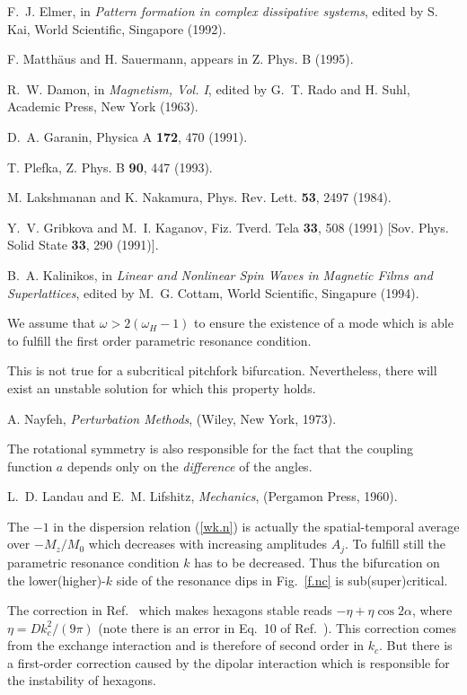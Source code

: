 \begin{references}
F.~J. Elmer, in {\it Pattern formation in complex dissipative
systems}, edited by S. Kai, World Scientific, Singapore (1992).

F. Matth\"aus and H. Sauermann, appears in Z. Phys. B (1995).

R.~W. Damon, in {\it Magnetism, Vol. I}, edited by G.~T. Rado and
H. Suhl, Academic Press, New York (1963).

D.~A. Garanin, Physica A {\bf 172}, 470 (1991).

T. Plefka, Z. Phys. B {\bf 90}, 447 (1993).

M. Lakshmanan and K. Nakamura, Phys. Rev. Lett. {\bf 53}, 2497 
(1984).

Y.~V. Gribkova and M.~I. Kaganov, Fiz. Tverd. Tela {\bf 33}, 508 
(1991) [Sov. Phys. Solid State {\bf 33}, 290 (1991)].

B.~A. Kalinikos, in {\it Linear and Nonlinear Spin Waves in Magnetic
Films and Superlattices}, edited by M.~G. Cottam, World Scientific,
Singapure (1994).

We assume that $\omega>2(\omega_H-1)$ to ensure the existence of a
mode which is able to fulfill the first order parametric resonance
condition.

This is not true for a subcritical pitchfork bifurcation.
Nevertheless, there will exist an unstable solution for which this
property holds.

A. Nayfeh, {\it Perturbation Methods}, (Wiley, New York, 1973).

The rotational symmetry is also responsible for the fact that the
coupling function $a$ depends only on the {\em difference\/} of the 
angles.

L.~D. Landau and E.~M. Lifshitz, {\it Mechanics}, (Pergamon Press,
1960).

The $-1$ in the dispersion relation (\ref{wk.n}) is actually the 
spatial-temporal average over $-M_z/M_0$ which decreases with
increasing amplitudes $A_j$. To fulfill still the parametric
resonance condition $k$ has to be decreased. Thus the bifurcation on
the lower(higher)-$k$ side of the resonance dips in Fig.~\ref{f.nc}
is sub(super)critical.

The correction in Ref.~ which makes hexagons
stable reads $-\eta+\eta\cos 2\alpha$, where $\eta=Dk_c^2/(9\pi)$
(note there is an error in Eq.~10 of Ref.~). This
correction comes from the exchange interaction and is therefore of 
second order in $k_c$. But there is a first-order correction caused
by the dipolar interaction which is responsible for the instability
of hexagons.


\end{references}

